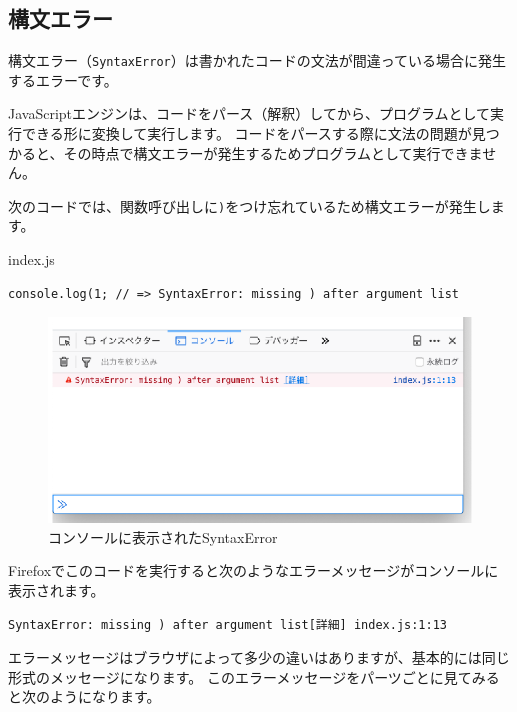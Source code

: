 \hypertarget{syntax-error}{%
\subsection{構文エラー}\label{syntax-error}}

構文エラー（\texttt{SyntaxError}）は書かれたコードの文法が間違っている場合に発生するエラーです。

JavaScriptエンジンは、コードをパース（解釈）してから、プログラムとして実行できる形に変換して実行します。
コードをパースする際に文法の問題が見つかると、その時点で構文エラーが発生するためプログラムとして実行できません。

次のコードでは、関数呼び出しに\texttt{)}をつけ忘れているため構文エラーが発生します。

\begin{listtitle}
index.js
\end{listtitle}
\begin{lstlisting}
console.log(1; // => SyntaxError: missing ) after argument list
\end{lstlisting}
\listend

\begin{figure}
\centering
\includegraphics[width=140mm]{./fig/syntax-error.eps}
\caption{コンソールに表示されたSyntaxError}
\end{figure}

Firefoxでこのコードを実行すると次のようなエラーメッセージがコンソールに表示されます。

\begin{lstlisting}
SyntaxError: missing ) after argument list[詳細] index.js:1:13
\end{lstlisting}

エラーメッセージはブラウザによって多少の違いはありますが、基本的には同じ形式のメッセージになります。
このエラーメッセージをパーツごとに見てみると次のようになります。

